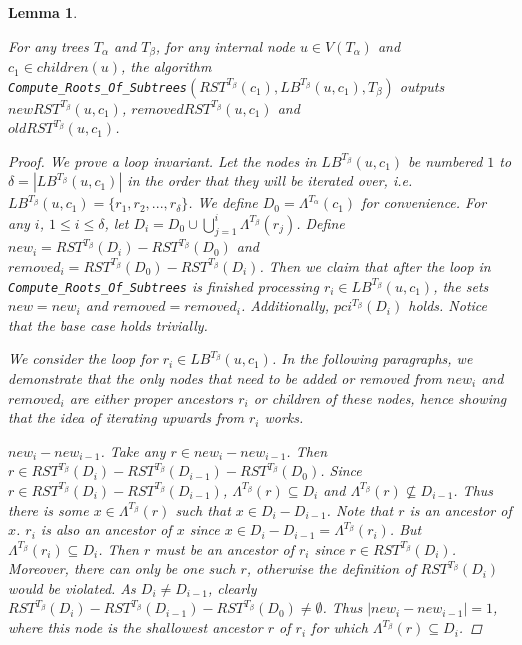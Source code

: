 \documentclass{article}
\newcommand{\leafset}{\Lambda}
\newcommand{\TA}{T_\alpha}
\newcommand{\TB}{T_\beta}
\newtheorem{computerootsofsubtreescorrectness}[incompatibility]{Lemma}
\begin{document}
    \bigskip
    \begin{computerootsofsubtreescorrectness}
        \label{lem:computerootsofsubtreescorrectness}

        For any trees $\TA$ and $\TB$, for any internal node $u \in V(\TA)$ and $c_1 \in children(u)$, the algorithm\\ %
        \texttt{Compute\_Roots\_Of\_Subtrees}$(RST^{\TB}(c_1), LB^{\TB}(u, c_1), \TB)$ outputs $newRST^{\TB}(u, c_1)$, $removedRST^{\TB}(u, c_1)$ and\\ %
        $oldRST^{\TB}(u, c_1)$.

        \begin{proof}
            We prove a loop invariant. Let the nodes in $LB^{\TB}(u, c_1)$ be numbered $1$ to $\delta = |LB^{\TB}(u, c_1)|$ in the order that they will be iterated over, i.e. $LB^{\TB}(u, c_1) = \{r_1, r_2, ..., r_{\delta}\}$. We define $D_0 = \leafset^{\TA}(c_1)$ for convenience. For any $i$, $1 \leq i \leq \delta$, let $D_i = D_0 \cup \bigcup_{j = 1}^{i} \leafset^{\TB}(r_j)$. Define $new_i = RST^{\TB}(D_i) - RST^{\TB}(D_0)$ and $removed_i = RST^{\TB}(D_0) - RST^{\TB}(D_i)$. Then we claim that after the loop in \texttt{Compute\_Roots\_Of\_Subtrees} is finished processing $r_i \in LB^{\TB}(u, c_1)$, the sets $new = new_i$ and $removed = removed_i$. Additionally, $pci^{\TB}(D_i)$ holds. Notice that the base case holds trivially.

            We consider the loop for $r_i \in LB^{\TB}(u, c_1)$. In the following paragraphs, we demonstrate that the only nodes that need to be added or removed from $new_i$ and $removed_i$ are either proper ancestors $r_i$ or children of these nodes, hence showing that the idea of iterating upwards from $r_i$ works.

            \textit{$new_i - new_{i-1}$.} Take any $r \in new_i - new_{i-1}$. Then $r \in RST^{\TB}(D_i) - RST^{\TB}(D_{i-1}) - RST^{\TB}(D_0)$. Since $r \in RST^{\TB}(D_i) - RST^{\TB}(D_{i-1})$, $\leafset^{\TB}(r) \subseteq D_i$ and $\leafset^{\TB}(r) \not\subseteq D_{i-1}$. Thus there is some $x \in \leafset^{\TB}(r)$ such that $x \in D_i - D_{i-1}$. Note that $r$ is an ancestor of $x$. $r_i$ is also an ancestor of $x$ since $x \in D_i - D_{i-1} = \leafset^{\TB}(r_i)$. But $\leafset^{\TB}(r_i) \subseteq D_i$. Then $r$ must be an ancestor of $r_i$ since $r \in RST^{\TB}(D_i)$. Moreover, there can only be one such $r$, otherwise the definition of $RST^{\TB}(D_i)$ would be violated. As $D_i \neq D_{i-1}$, clearly $RST^{\TB}(D_i) - RST^{\TB}(D_{i-1}) - RST^{\TB}(D_0) \neq \emptyset$. Thus $|new_i - new_{i-1}| = 1$, where this node is the shallowest ancestor $r$ of $r_i$ for which $\leafset^{\TB}(r) \subseteq D_i$.


\end{proof}
\end{computerootsofsubtreescorrectness}
\end{document}
